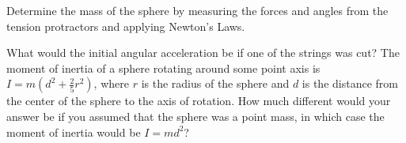 \documentclass[11pt,letterpaper]{article}
\begin{document}
Determine the mass of the sphere by measuring the forces and angles from the tension protractors and applying Newton's Laws.

What would the initial angular acceleration be if one of the strings was cut? The moment of inertia of a sphere rotating around some point axis is $I=m\left(d^2+\frac{2}{5}r^2\right)$, where $r$ is the radius of the sphere and $d$ is the distance from the center of the sphere to the axis of rotation. How much different would your answer be if you assumed that the sphere was a point mass, in which case the moment of inertia would be $I=md^2$?
\end{document}
